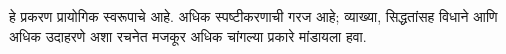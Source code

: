 \documentclass[../../../include/open-logic-chapter]{subfiles}
\begin{document}

\begin{editorial}
  हे प्रकरण प्रायोगिक स्वरूपाचे आहे. अधिक स्पष्टीकरणाची
  गरज आहे; व्याख्या, सिद्धतांसह विधाने आणि अधिक
  उदाहरणे अशा रचनेत मजकूर अधिक चांगल्या प्रकारे
  मांडायला हवा.
\end{editorial}


\OLEndChapterHook
\end{document}
